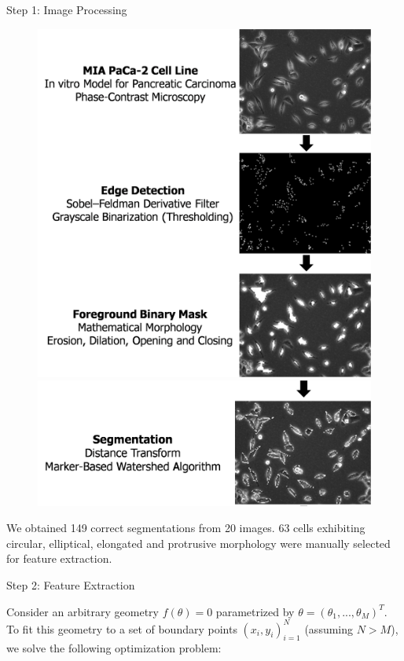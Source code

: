 \documentclass[final,hyperref={pdfpagelabels=false}]{beamer}
\begin{document}
\begin{frame}[t]
\begin{columns}[t]
\begin{column}{.465\textwidth}
\begin{block}{Step 1: Image Processing}
\begin{figure}
\includegraphics[width=0.95\linewidth]{ImgProcess1Sml.png}\\
\includegraphics[width=0.95\linewidth]{ImgProcess2Sml_Cropped.png}
\end{figure}

We obtained 149 correct segmentations from 20 images. 63 cells exhibiting circular, elliptical, elongated and protrusive morphology were manually selected for feature extraction.

\end{block}


\begin{block}{Step 2: Feature Extraction}

Consider an arbitrary geometry $f(\theta)=0$ parametrized by $\theta = (\theta_1,...,\theta_M)^T$.\\
To fit this geometry to a set of boundary points $(x_i,y_i)_{i=1}^{N}$ (assuming $N > M$), we solve the following
optimization problem:


\end{block}
\end{column}
\end{columns}
\end{frame}
\end{document}
